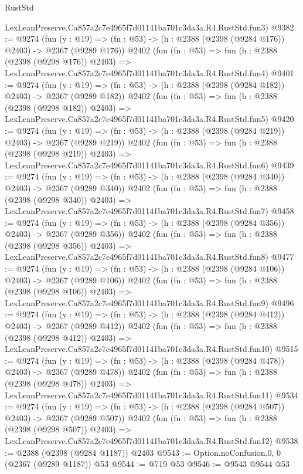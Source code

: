 \begin{lexlean}{RustStd}
\begin{coremodule}
    LexLeanPreserve.Ca857a2c7e4965f7d01141ba701c3da3a.R4.RustStd.fun3)
@9382 := @9274
    (fun (y : @19) => (fn : @53) -> (h : @2388 (@2398 (@9284 @176)) @2403) -> @2367 (@9289 @176))
    @2402
    (fun (fn : @53) =>
    fun (h : @2388 (@2398 (@9298 @176)) @2403) =>
    LexLeanPreserve.Ca857a2c7e4965f7d01141ba701c3da3a.R4.RustStd.fun4)
@9401 := @9274
    (fun (y : @19) => (fn : @53) -> (h : @2388 (@2398 (@9284 @182)) @2403) -> @2367 (@9289 @182))
    @2402
    (fun (fn : @53) =>
    fun (h : @2388 (@2398 (@9298 @182)) @2403) =>
    LexLeanPreserve.Ca857a2c7e4965f7d01141ba701c3da3a.R4.RustStd.fun5)
@9420 := @9274
    (fun (y : @19) => (fn : @53) -> (h : @2388 (@2398 (@9284 @219)) @2403) -> @2367 (@9289 @219))
    @2402
    (fun (fn : @53) =>
    fun (h : @2388 (@2398 (@9298 @219)) @2403) =>
    LexLeanPreserve.Ca857a2c7e4965f7d01141ba701c3da3a.R4.RustStd.fun6)
@9439 := @9274
    (fun (y : @19) => (fn : @53) -> (h : @2388 (@2398 (@9284 @340)) @2403) -> @2367 (@9289 @340))
    @2402
    (fun (fn : @53) =>
    fun (h : @2388 (@2398 (@9298 @340)) @2403) =>
    LexLeanPreserve.Ca857a2c7e4965f7d01141ba701c3da3a.R4.RustStd.fun7)
@9458 := @9274
    (fun (y : @19) => (fn : @53) -> (h : @2388 (@2398 (@9284 @356)) @2403) -> @2367 (@9289 @356))
    @2402
    (fun (fn : @53) =>
    fun (h : @2388 (@2398 (@9298 @356)) @2403) =>
    LexLeanPreserve.Ca857a2c7e4965f7d01141ba701c3da3a.R4.RustStd.fun8)
@9477 := @9274
    (fun (y : @19) => (fn : @53) -> (h : @2388 (@2398 (@9284 @106)) @2403) -> @2367 (@9289 @106))
    @2402
    (fun (fn : @53) =>
    fun (h : @2388 (@2398 (@9298 @106)) @2403) =>
    LexLeanPreserve.Ca857a2c7e4965f7d01141ba701c3da3a.R4.RustStd.fun9)
@9496 := @9274
    (fun (y : @19) => (fn : @53) -> (h : @2388 (@2398 (@9284 @412)) @2403) -> @2367 (@9289 @412))
    @2402
    (fun (fn : @53) =>
    fun (h : @2388 (@2398 (@9298 @412)) @2403) =>
    LexLeanPreserve.Ca857a2c7e4965f7d01141ba701c3da3a.R4.RustStd.fun10)
@9515 := @9274
    (fun (y : @19) => (fn : @53) -> (h : @2388 (@2398 (@9284 @478)) @2403) -> @2367 (@9289 @478))
    @2402
    (fun (fn : @53) =>
    fun (h : @2388 (@2398 (@9298 @478)) @2403) =>
    LexLeanPreserve.Ca857a2c7e4965f7d01141ba701c3da3a.R4.RustStd.fun11)
@9534 := @9274
    (fun (y : @19) => (fn : @53) -> (h : @2388 (@2398 (@9284 @507)) @2403) -> @2367 (@9289 @507))
    @2402
    (fun (fn : @53) =>
    fun (h : @2388 (@2398 (@9298 @507)) @2403) =>
    LexLeanPreserve.Ca857a2c7e4965f7d01141ba701c3da3a.R4.RustStd.fun12)
@9538 := @2388 (@2398 (@9284 @1187)) @2403
@9543 := Option.noConfusion.{0, 0} (@2367 (@9289 @1187)) @53
@9544 := @719 @53
@9546 := @9543 @9544 @53

\end{coremodule}
\end{lexlean}
